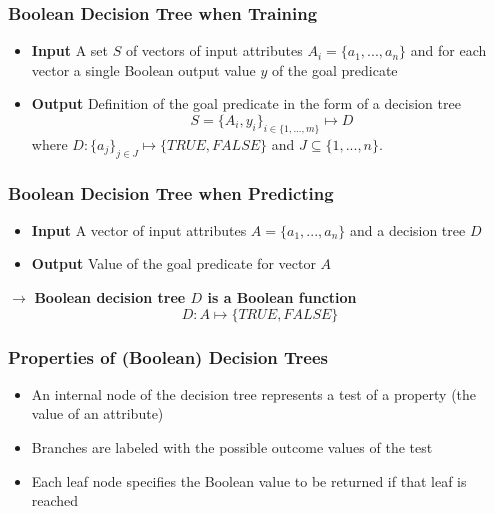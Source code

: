 \documentclass[conference]{styles/acmsiggraph}
\begin{document}
        \subsubsection{Boolean Decision Tree when Training}
            \begin{itemize}
                \item \textbf{Input}\newline
                A set $S$ of vectors of input attributes $A_i = \{a_1,...,a_n\}$ and for each vector a single Boolean output value $y$ of the goal predicate
                \item \textbf{Output}\newline
                Definition of the goal predicate in the form of a decision tree
                $$S = \{A_i,y_i\}_{i \in \{1,...,m\}} \mapsto D$$
                where $D: \{a_j\}_{j \in J} \mapsto \{TRUE,FALSE\}$ and $J \subseteq \{1,...,n\}$.
            \end{itemize}
        
        \subsubsection{Boolean Decision Tree when Predicting}
            \begin{itemize}
                \item \textbf{Input}\newline
                A vector of input attributes $A = \{a_1,...,a_n\}$ and a decision tree $D$
                \item \textbf{Output}\newline
                Value of the goal predicate for vector $A$
            \end{itemize}
            $\rightarrow$ \textbf{Boolean decision tree $D$ is a Boolean function}
            $$D: A \mapsto \{TRUE,FALSE\}$$
        
        \subsubsection{Properties of (Boolean) Decision Trees}
            \begin{itemize}
                \item An internal node of the decision tree represents a test of a property (the value of an attribute)
                \item Branches are labeled with the possible outcome values of the test
                \item Each leaf node specifies the Boolean value to be returned if that leaf is reached
            \end{itemize}
\end{document}
